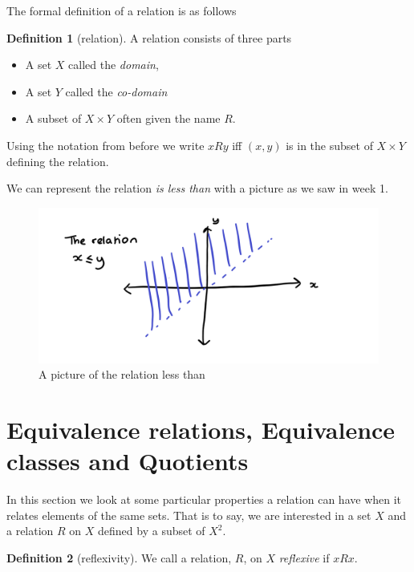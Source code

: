 \documentclass[
]{book}
\theoremstyle{definition}
\newtheorem{definition}{Definition}[chapter]
\theoremstyle{definition}
\theoremstyle{definition}
\theoremstyle{definition}
\theoremstyle{remark}
\begin{document}
The formal definition of a relation is as follows

\begin{definition}[relation]
A relation consists of three parts

\begin{itemize}
\item
  A set \(X\) called the \emph{domain},
\item
  A set \(Y\) called the \emph{co-domain}
\item
  A subset of \(X \times Y\) often given the name \(R\).
\end{itemize}

Using the notation from before we write \(x R y\) iff \((x,y)\) is in the subset of \(X \times Y\) defining the relation.
\end{definition}

We can represent the relation \emph{is less than} with a picture as we saw in week 1.

\begin{figure}
\centering
\includegraphics{less than.png}
\caption{\label{fig:unnamed-chunk-24}A picture of the relation less than}
\end{figure}

\section{Equivalence relations, Equivalence classes and Quotients}\label{equivalence-relations-equivalence-classes-and-quotients}

In this section we look at some particular properties a relation can have when it relates elements of the same sets. That is to say, we are interested in a set \(X\) and a relation \(R\) on \(X\) defined by a subset of \(X^2\).

\begin{definition}[reflexivity]
We call a relation, \(R\), on \(X\) \emph{reflexive} if \(x R x\).
\end{definition}
\end{document}
